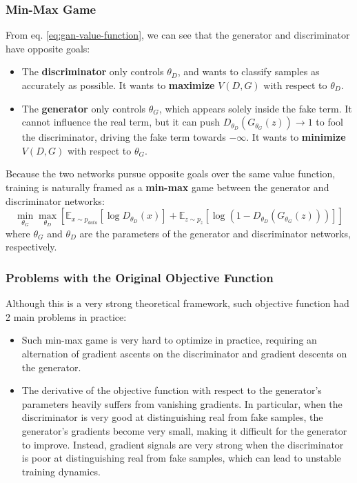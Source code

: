 \subsubsection{Min-Max Game}
From eq. \ref{eq:gan-value-function}, we can see that the generator and discriminator have opposite goals:
\begin{itemize}
    \item The \textbf{discriminator} only controls $\theta_D$, and wants to classify samples as accurately as possible. 
    It wants to \textbf{maximize} $V(D,G)$ with respect to $\theta_D$.
    \item The \textbf{generator} only controls $\theta_G$, which appears solely inside the fake term. 
    It cannot influence the real term, but it can push $D_{\theta_D}(G_{\theta_G}(z)) \rightarrow 1$ to fool the discriminator, driving the fake term towards $-\infty$. 
    It wants to \textbf{minimize} $V(D,G)$ with respect to $\theta_G$.
\end{itemize}

Because the two networks pursue opposite goals over the same value function, training is naturally framed as a \textbf{min-max} game between the generator and discriminator networks:
\begin{equation}
    \min_{\theta_G} \max_{\theta_D} \left[ \mathbb{E}_{x \sim p_{data}}[\log D_{\theta_D}(x)] + \mathbb{E}_{z \sim p_{z}}[ \log(1 - D_{\theta_D}(G_{\theta_G}(z)))] \right]
\end{equation}
where $\theta_G$ and $\theta_D$ are the parameters of the generator and discriminator networks, respectively.


\subsubsection{Problems with the Original Objective Function}
Although this is a very strong theoretical framework, such objective function had 2 main problems in practice:
\begin{itemize}
    \item Such min-max game is very hard to optimize in practice, requiring an alternation of gradient ascents on the discriminator and gradient descents on the generator.
    
    \item The derivative of the objective function with respect to the generator's parameters heavily suffers from vanishing gradients. 
    In particular, when the discriminator is very good at distinguishing real from fake samples, the generator's gradients become very small, making it difficult for the generator to improve.
    Instead, gradient signals are very strong when the discriminator is poor at distinguishing real from fake samples, which can lead to unstable training dynamics.
\end{itemize}

